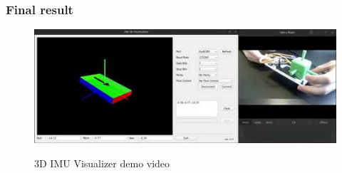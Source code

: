 \subsubsection{Final result}
\begin{figure}[H]
    \centering
        \href{https://youtu.be/qVYGa0Z1S-M}{
            \includegraphics[width=\linewidth]{./projects/pmodnav/pmodnav_thumbnail.jpg}
        }
        \caption{3D IMU Visualizer demo video}
\end{figure}

